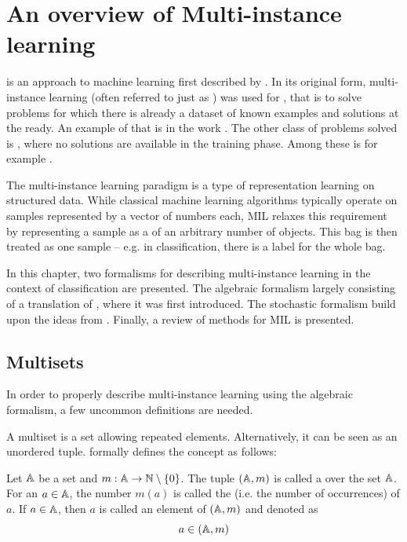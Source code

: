 \chapter{An overview of Multi-instance learning}\label{chap:MIL}

 is an approach to machine learning first described by \cite{dietterich_solving_1997}. In its original form, multi-instance learning (often referred to just as ) was used for , that is to solve problems for which there is already a dataset of known examples and solutions at the ready. An example of that is in the work \cite{amores_multiple_2013}. The other class of problems solved is , where no solutions are available in the training phase. Among these is for example \cite{chen_contextual_2012}.

The multi-instance learning paradigm is a type of representation learning on structured data. While classical machine learning algorithms typically operate on samples represented by a vector of numbers each, MIL relaxes this requirement by representing a sample as a  of an arbitrary number of objects. This bag is then treated as one sample -- e.g. in classification, there is a label for the whole bag.

In this chapter, two formalisms for describing multi-instance learning in the context of classification are presented. The algebraic formalism largely consisting of a translation of \cite{dedic_hierarchicke_2017}, where it was first introduced. The stochastic formalism build upon the ideas from \cite{muandet_learning_2012}. Finally, a review of methods for MIL is presented.

\section{Multisets}

In order to properly describe multi-instance learning using the algebraic formalism, a few uncommon definitions are needed.

A multiset is a set allowing repeated elements. Alternatively, it can be seen as an unordered tuple. \cite{knuth_art_1968} formally defines the concept as follows:

\begin{define}
	Let \( \mathbb{A} \) be a set and \( m : \mathbb{A} \to \mathbb{N} \setminus \left\{ 0 \right\} \). The tuple \( \left( \mathbb{A}, m \right) \) is called a  over the set \( \mathbb{A} \). For an \( a \in \mathbb{A} \), the number \( m \left( a \right) \) is called the  (i.e. the number of occurrences) of \( a \). If \( a \in \mathbb{A} \), then \( a \) is called an element of \( \left( \mathbb{A}, m \right) \) and denoted as
	\[ a \in \left( \mathbb{A}, m \right) \]
\end{define}

